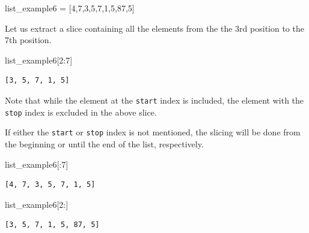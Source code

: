 \documentclass[
  letterpaper,
  DIV=11,
  numbers=noendperiod]{scrreprt}
\newenvironment{Shaded}{\begin{snugshade}}{\end{snugshade}}
\newcommand{\DecValTok}[1]{\textcolor[rgb]{0.68,0.00,0.00}{#1}}
\newcommand{\NormalTok}[1]{\textcolor[rgb]{0.00,0.23,0.31}{#1}}
\newcommand{\OperatorTok}[1]{\textcolor[rgb]{0.37,0.37,0.37}{#1}}
\begin{document}
\begin{Shaded}
\begin{Highlighting}[]
\NormalTok{list\_example6 }\OperatorTok{=}\NormalTok{ [}\DecValTok{4}\NormalTok{,}\DecValTok{7}\NormalTok{,}\DecValTok{3}\NormalTok{,}\DecValTok{5}\NormalTok{,}\DecValTok{7}\NormalTok{,}\DecValTok{1}\NormalTok{,}\DecValTok{5}\NormalTok{,}\DecValTok{87}\NormalTok{,}\DecValTok{5}\NormalTok{]}
\end{Highlighting}
\end{Shaded}

Let us extract a slice containing all the elements from the the 3rd
position to the 7th position.

\begin{Shaded}
\begin{Highlighting}[]
\NormalTok{list\_example6[}\DecValTok{2}\NormalTok{:}\DecValTok{7}\NormalTok{]}
\end{Highlighting}
\end{Shaded}

\begin{verbatim}
[3, 5, 7, 1, 5]
\end{verbatim}

Note that while the element at the \texttt{start} index is included, the
element with the \texttt{stop} index is excluded in the above slice.

If either the \texttt{start} or \texttt{stop} index is not mentioned,
the slicing will be done from the beginning or until the end of the
list, respectively.

\begin{Shaded}
\begin{Highlighting}[]
\NormalTok{list\_example6[:}\DecValTok{7}\NormalTok{]}
\end{Highlighting}
\end{Shaded}

\begin{verbatim}
[4, 7, 3, 5, 7, 1, 5]
\end{verbatim}

\begin{Shaded}
\begin{Highlighting}[]
\NormalTok{list\_example6[}\DecValTok{2}\NormalTok{:]}
\end{Highlighting}
\end{Shaded}

\begin{verbatim}
[3, 5, 7, 1, 5, 87, 5]
\end{verbatim}
\end{document}
